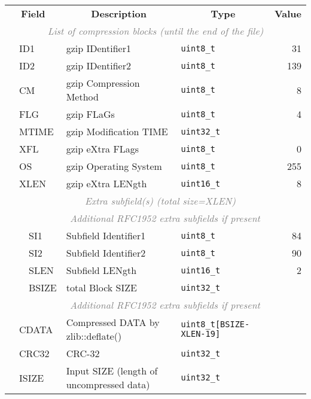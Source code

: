 \documentclass[10pt]{article}
\begin{document}
\begin{table}[H]
{\small
\begin{tabular}{|l|l|l|l|l|r|}
  \cline{1-6}
  \multicolumn{3}{|c|}{\bf Field} & \multicolumn{1}{c|}{\bf Description} & \multicolumn{1}{c|}{\bf Type} & \multicolumn{1}{c|}{\bf Value} \\\cline{1-6}
  \multicolumn{6}{|c|}{\textcolor{gray}{\it List of compression blocks (until the end of the file)}} \\\cline{2-6}
  & \multicolumn{2}{l|}{\sf ID1} & gzip IDentifier1 & {\tt uint8\_t} & 31 \\\cline{2-6}
  & \multicolumn{2}{l|}{\sf ID2} & gzip IDentifier2 & {\tt uint8\_t} & 139 \\\cline{2-6}
  & \multicolumn{2}{l|}{\sf CM} & gzip Compression Method & {\tt uint8\_t} & 8 \\\cline{2-6}
  & \multicolumn{2}{l|}{\sf FLG} & gzip FLaGs & {\tt uint8\_t} & 4 \\\cline{2-6}
  & \multicolumn{2}{l|}{\sf MTIME} & gzip Modification TIME & {\tt uint32\_t} & \\\cline{2-6}
  & \multicolumn{2}{l|}{\sf XFL} & gzip eXtra FLags & {\tt uint8\_t} & 0 \\\cline{2-6}
  & \multicolumn{2}{l|}{\sf OS} & gzip Operating System & {\tt uint8\_t} & 255 \\\cline{2-6}
  & \multicolumn{2}{l|}{\sf XLEN} & gzip eXtra LENgth & {\tt uint16\_t} & 8 \\\cline{2-6}
  & \multicolumn{5}{c|}{\textcolor{gray}{\it Extra subfield(s) (total size=XLEN)}} \\\cline{3-6}
  & & \multicolumn{4}{c|}{\textcolor{gray}{\it Additional RFC1952 extra subfields if present}} \\\cline{3-6}
  & & {\sf SI1} & Subfield Identifier1 & {\tt uint8\_t} & 84 \\\cline{3-6}
  & & {\sf SI2} & Subfield Identifier2 & {\tt uint8\_t} & 90 \\\cline{3-6}
  & & {\sf SLEN} & Subfield LENgth & {\tt uint16\_t} & 2 \\\cline{3-6}
  & & {\sf BSIZE} & total Block SIZE & {\tt uint32\_t} & \\\cline{3-6}
  & & \multicolumn{4}{c|}{\textcolor{gray}{\it Additional RFC1952 extra subfields if present}} \\\cline{2-6}
  & \multicolumn{2}{l|}{\sf CDATA} & Compressed DATA by {\sf zlib::deflate()} & {\tt uint8\_t[{\sf BSIZE-XLEN-19}]} & \\\cline{2-6}
  & \multicolumn{2}{l|}{\sf CRC32} & CRC-32 & {\tt uint32\_t} & \\\cline{2-6}
  & \multicolumn{2}{l|}{\sf ISIZE} & Input SIZE (length of uncompressed data) & {\tt uint32\_t} & \\
  \cline{1-6}
\end{tabular}}
\end{table}
\end{document}
